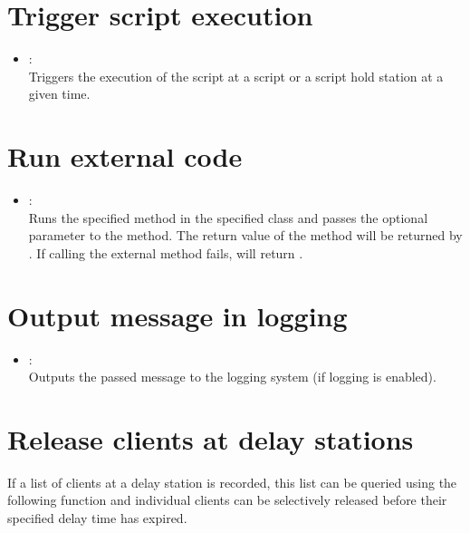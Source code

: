 \section{Trigger script execution}

\begin{itemize}

\item
{}:\\
Triggers the execution of the script at a script or a script hold station at a given time.

\end{itemize}

\section{Run external code}

\begin{itemize}

\item
{}:\\
Runs the specified method in the specified class and passes the optional parameter  to the method.
The return value of the method will be returned by . If calling the external method fails,
 will return .

\end{itemize}

\section{Output message in logging}

\begin{itemize}

\item
{}:\\
Outputs the passed message to the logging system (if logging is enabled).

\end{itemize}

\section{Release clients at delay stations}

If a list of clients at a delay station is recorded, this list can be queried using the
following function and individual clients can be selectively released before their
specified delay time has expired.

